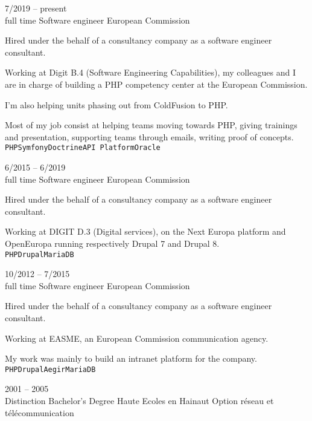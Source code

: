 \begin{entrylist}
	\entry
		{7/2019 -- present\\\footnotesize{full time}}
		{Software engineer}
        {European Commission}
        {
			Hired under the behalf of a consultancy company as a software engineer consultant.

            Working at Digit B.4 (Software Engineering Capabilities), my colleagues and I are in charge of building a PHP competency center at the European Commission.

            I'm also helping units phasing out from ColdFusion to PHP.

            Most of my job consist at helping teams moving towards PHP, giving trainings and presentation, supporting teams through emails, writing proof of concepts.
			\\ \texttt{PHP}\slashsep\texttt{Symfony}\slashsep\texttt{Doctrine}\slashsep\texttt{API Platform}\slashsep\texttt{Oracle}
        }
	\entry
		{6/2015 -- 6/2019\\\footnotesize{full time}}
		{Software engineer}
        {European Commission}
        {
			Hired under the behalf of a consultancy company as a software engineer consultant.

			Working at DIGIT D.3 (Digital services), on the Next Europa platform and OpenEuropa running respectively Drupal 7 and Drupal 8.
			\\ \texttt{PHP}\slashsep\texttt{Drupal}\slashsep\texttt{MariaDB}
        }
	\entry
		{10/2012 -- 7/2015\\\footnotesize{full time}}
		{Software engineer}
        {European Commission}
        {
			Hired under the behalf of a consultancy company as a software engineer consultant.

			Working at EASME, an European Commission communication agency.

			My work was mainly to build an intranet platform for the company.
			\\ \texttt{PHP}\slashsep\texttt{Drupal}\slashsep\texttt{Aegir}\slashsep\texttt{MariaDB}
        }
\end{entrylist}



\begin{entrylist}
	\entry
		{2001 -- 2005\\\footnotesize{Distinction}}
		{Bachelor's Degree}
		{Haute Ecoles en Hainaut}
		{Option réseau et télécommunication}
\end{entrylist}

